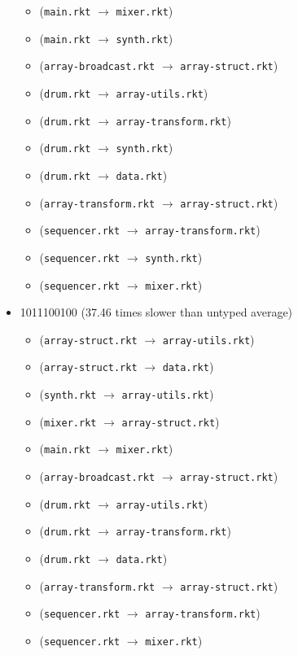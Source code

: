 \documentclass{article}
\newcommand{\mono}[1]{\texttt{#1}}
\begin{document}
\begin{itemize}
\begin{itemize}
  \item (\mono{main.rkt} $\rightarrow$ \mono{mixer.rkt})
  \item (\mono{main.rkt} $\rightarrow$ \mono{synth.rkt})
  \item (\mono{array-broadcast.rkt} $\rightarrow$ \mono{array-struct.rkt})
  \item (\mono{drum.rkt} $\rightarrow$ \mono{array-utils.rkt})
  \item (\mono{drum.rkt} $\rightarrow$ \mono{array-transform.rkt})
  \item (\mono{drum.rkt} $\rightarrow$ \mono{synth.rkt})
  \item (\mono{drum.rkt} $\rightarrow$ \mono{data.rkt})
  \item (\mono{array-transform.rkt} $\rightarrow$ \mono{array-struct.rkt})
  \item (\mono{sequencer.rkt} $\rightarrow$ \mono{array-transform.rkt})
  \item (\mono{sequencer.rkt} $\rightarrow$ \mono{synth.rkt})
  \item (\mono{sequencer.rkt} $\rightarrow$ \mono{mixer.rkt})
  \end{itemize}
\item 1011100100 (37.46 times slower than untyped average)
  \begin{itemize}
  \item (\mono{array-struct.rkt} $\rightarrow$ \mono{array-utils.rkt})
  \item (\mono{array-struct.rkt} $\rightarrow$ \mono{data.rkt})
  \item (\mono{synth.rkt} $\rightarrow$ \mono{array-utils.rkt})
  \item (\mono{mixer.rkt} $\rightarrow$ \mono{array-struct.rkt})
  \item (\mono{main.rkt} $\rightarrow$ \mono{mixer.rkt})
  \item (\mono{array-broadcast.rkt} $\rightarrow$ \mono{array-struct.rkt})
  \item (\mono{drum.rkt} $\rightarrow$ \mono{array-utils.rkt})
  \item (\mono{drum.rkt} $\rightarrow$ \mono{array-transform.rkt})
  \item (\mono{drum.rkt} $\rightarrow$ \mono{data.rkt})
  \item (\mono{array-transform.rkt} $\rightarrow$ \mono{array-struct.rkt})
  \item (\mono{sequencer.rkt} $\rightarrow$ \mono{array-transform.rkt})
  \item (\mono{sequencer.rkt} $\rightarrow$ \mono{mixer.rkt})

\end{itemize}
\end{itemize}
\end{document}
